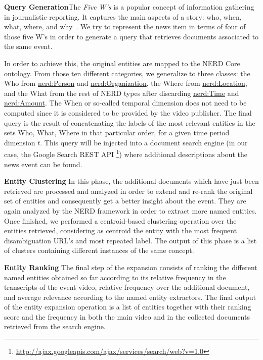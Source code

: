 \documentclass{llncs}
\begin{document}
\textbf{Query Generation}The \emph{Five W's} is a popular concept of information gathering in journalistic reporting. It captures the main aspects of a story: who, when, what, where, and why~\cite{LiJia2007}. We try to represent the news item in terms of four of those five W's in order to generate a query that retrieves documents associated to the same event.

In order to achieve this, the original entities are mapped to the NERD Core ontology. From those ten different categories, we generalize to three classes: the Who from \url{nerd:Person} and \url{nerd:Organization}, the Where from \url{nerd:Location}, and the What from the rest of NERD types after discarding \url{nerd:Time} and \url{nerd:Amount}. The When or so-called temporal dimension does not need to be computed since it is considered to be provided by the video publisher. The final query is the result of concatenating the labels of the most relevant entities in the sets Who, What, Where in that particular order, for a given time period dimension $t$.  
This query will be injected into a document search engine (in our case, the Google Search REST API \footnote{\fontsize{8pt}{1em}\selectfont  \url{http://ajax.googleapis.com/ajax/services/search/web?v=1.0}}) where additional descriptions about the news event can be found.

\textbf{Entity Clustering}
In this phase, the additional documents which have just been retrieved are processed and analyzed in order to extend and re-rank the original set of entities and consequently get a better insight about the event. They are again analyzed by the NERD framework in order to extract more named entities. Once finished, we performed a centroid-based clustering operation over the entities retrieved, considering as centroid the entity with the most frequent disambiguation URL's and most repeated label. The output of this phase is a list of clusters containing different instances of the same concept.

\textbf{Entity Ranking}
The final step of the expansion consists of ranking the different named entities obtained so far according to its relative frequency in the transcripts of the event video, relative frequency over the additional document, and average relevance according to the named entity extractors. The final output of the entity expansion operation is a list of entities together with their ranking score and the frequency in both the main video and in the collected documents retrieved from the search engine.
\end{document}
